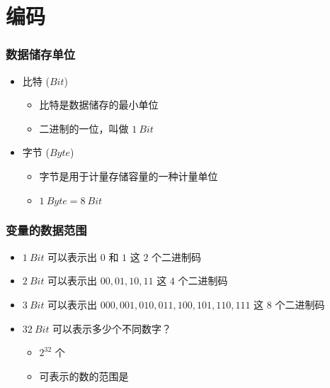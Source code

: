 \section{编码}

\begin{frame}[fragile]
    \frametitle{数据储存单位}

    \begin{itemize}
        \item<1-> 比特 ($Bit$)
        
        \begin{itemize}
            \item 比特是数据储存的最小单位
            \item 二进制的一位，叫做 $1\ Bit$
        \end{itemize}

        \item<2-> 字节 ($Byte$)
        
        \begin{itemize}
            \item 字节是用于计量存储容量的一种计量单位
            \item $1\ Byte = 8\ Bit$
        \end{itemize}

    \end{itemize}
    
\end{frame}

\begin{frame}[fragile]
    \frametitle{变量的数据范围}

    \begin{itemize}
        \item $1\ Bit$ 可以表示出 $0$ 和 $1$ 这 $2$ 个二进制码
        \item $2\ Bit$ 可以表示出 $00,01,10,11$ 这 $4$ 个二进制码
        \item $3\ Bit$ 可以表示出 $000,001,010,011 ,100,101,110,111$ 这 $8$ 个二进制码
        \item $32\ Bit$ 可以表示多少个不同数字？
        
        \begin{itemize}
            \item $2^{32}$ 个
            \item 可表示的数的范围是 
        \end{itemize}

    \end{itemize}
    
\end{frame}


